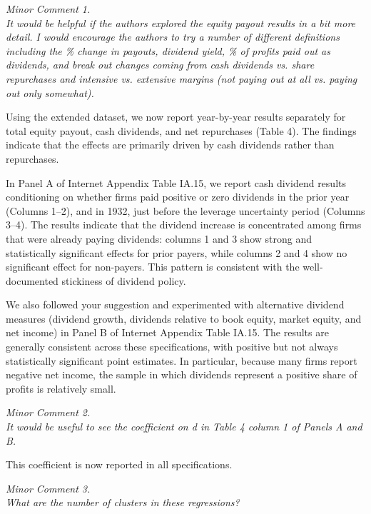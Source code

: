 \noindent \textit{\textcolor{red!60!black}{
Minor Comment 1.\\
It would be helpful if the authors explored the equity payout results in a bit more detail. I would encourage the authors to try a number of different definitions including the \% change in payouts, dividend yield, \% of profits paid out as dividends, and break out changes coming from cash dividends vs. share repurchases and intensive vs. extensive margins (not paying out at all vs. paying out only somewhat).
}}

\bigskip

\noindent Using the extended dataset, we now report year-by-year results separately for total equity payout, cash dividends, and net repurchases (Table 4). The findings indicate that the effects are primarily driven by cash dividends rather than repurchases. 

In Panel A of Internet Appendix Table IA.15, we report cash dividend results conditioning on whether firms paid positive or zero dividends in the prior year (Columns 1–2), and in 1932, just before the leverage uncertainty period (Columns 3–4). The results indicate that the dividend increase is concentrated among firms that were already paying dividends: columns 1 and 3 show strong and statistically significant effects for prior payers, while columns 2 and 4 show no significant effect for non-payers. This pattern is consistent with the well-documented stickiness of dividend policy.

We also followed your suggestion and experimented with alternative dividend measures (dividend growth, dividends relative to book equity, market equity, and net income) in Panel B of Internet Appendix Table IA.15. The results are generally consistent across these specifications, with positive but not always statistically significant point estimates. In particular, because many firms report negative net income, the sample in which dividends represent a positive share of profits is relatively small.

\noindent \textit{\textcolor{red!60!black}{
Minor Comment 2.\\
It would be useful to see the coefficient on d in Table 4 column 1 of Panels A and B.
}}

\bigskip

\noindent This coefficient is now reported in all specifications.

\noindent \textit{\textcolor{red!60!black}{
Minor Comment 3.\\
What are the number of clusters in these regressions?
}}

